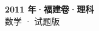 \documentclass[zihao=-4, a4paper]{ctexart}
\begin{document}
\begin{center}
  {\Large\bfseries 2011 年·福建卷·理科}\\[4pt]
  {\large 数学 · 试题版}
\end{center}
\medskip
{}

\end{document}
